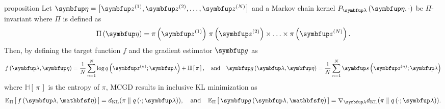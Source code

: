 
\begin{theoremEnd}{proposition}\label{thm:product_kernel}
  Let \(\veta = \left[ \vz^{(1)}, \vz^{(2)}, \ldots, \vz^{(N)} \right]\) and a Markov chain kernel \(P_{\vlambda}\left(\veta, \cdot\right)\) be \(\Pi\)-invariant where \(\Pi\) is defined as
  \[
  \Pi\left(\veta\right) = \pi\left(\vz^{(1)}\right) \, \pi\left(\vz^{(2)}\right) \times \ldots \times \pi\left(\vz^{(N)}\right).
  \]
  Then, by defining the target function \(f\) and the gradient estimator \(\vg\) as
  {
  \begin{align*}
    f\left(\vlambda, \veta\right) =  \frac{1}{N} \sum^{N}_{n=1} \log q\left(\vz^{(n)}; \vlambda\right) + \mathbb{H}\left[\,\pi\,\right], 
    \quad\text{and}\quad
    \vg\left(\vlambda, \veta\right) =  \frac{1}{N} \sum^{N}_{n=1} \vs\left(\vz^{(n)}; \vlambda\right)
  \end{align*}
  }
  where \(\mathbb{H}\left[\,\pi\,\right]\) is the entropy of \(\pi\), MCGD results in inclusive KL minimization as
  {
  \begin{align*}
    \Esub{\Pi}{ f\left(\vlambda, \rvveta\right) } = \DKL{\pi}{q\left(\cdot; \vlambda\right)},
    \quad\text{and}\quad
    \Esub{\Pi}{ \vg\left(\vlambda, \rvveta\right) } = \nabla_{\vlambda} \DKL{\pi}{q\left(\cdot; \vlambda\right)}.
  \end{align*}
  }
\end{theoremEnd}
